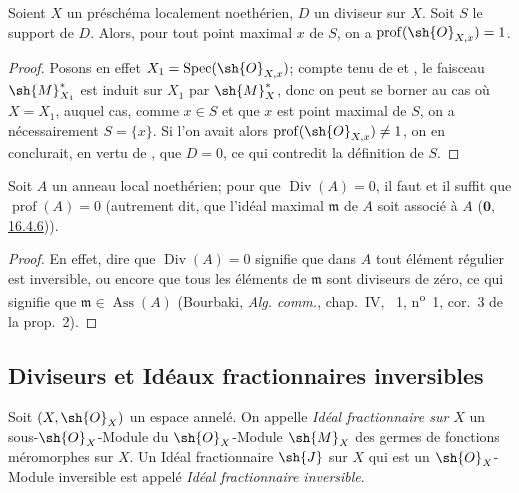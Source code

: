 \begin{corollary}[21.1.9]
\label{IV.21.1.9}
Soient $X$ un préschéma localement noethérien, $D$ un diviseur sur $X$.
Soit $S$ le support de $D$.
Alors, pour tout point maximal $x$ de $S$, on a $\operatorname{prof}(\sh{O}_{X,x})=1$.
\end{corollary}

\begin{proof}
Posons en effet $X_1=\operatorname{Spec}(\sh{O}_{X,x})$;
compte tenu de  et , le faisceau $\sh{M}_{X_1}^*$ est induit sur $X_1$ par $\sh{M}_X^*$, donc on peut se borner au cas où $X=X_1$, auquel cas, comme $x\in S$ et que $x$ est point maximal de $S$, on a nécessairement $S=\{x\}$.
Si l'on avait alors $\operatorname{prof}(\sh{O}_{X,x})\neq1$, on en conclurait, en vertu de , que $D=0$, ce qui contredit la définition de $S$.
\end{proof}

\begin{proposition}[21.1.10]
\label{IV.21.1.10}
Soit $A$ un anneau local noethérien;
pour que $\operatorname{Div}(A)=0$, il faut et il suffit que $\operatorname{prof}(A)=0$ (autrement dit, que l'idéal maximal $\mathfrak{m}$ de $A$ soit associé à $A$ (\hyperref[0.16.4.6]{$\mathbf{0}$, 16.4.6})).
\end{proposition}

\begin{proof}
En effet, dire que $\operatorname{Div}(A)=0$ signifie que dans $A$ tout élément régulier est inversible, ou encore que tous les éléments de $\mathfrak{m}$ sont diviseurs de zéro, ce qui signifie que $\mathfrak{m}\in\operatorname{Ass}(A)$ (Bourbaki, \emph{Alg. comm.}, chap.~IV, \textsection~1, n\textsuperscript{o}~1, cor.~3 de la prop.~2).
\end{proof}

\subsection{Diviseurs et Idéaux fractionnaires inversibles}
\label{subsection:IV.21.2}

\begin{env}[21.2.1]
\label{IV.21.2.1}
Soit $(X,\sh{O}_X)$ un espace annelé.
On appelle \emph{Idéal fractionnaire sur $X$} un sous-$\sh{O}_X$-Module du $\sh{O}_X$-Module $\sh{M}_X$ des germes de fonctions méromorphes sur $X$.
Un Idéal fractionnaire $\sh{J}$ sur $X$ qui est un $\sh{O}_X$-Module inversible est appelé \emph{Idéal fractionnaire inversible}.
\end{env}

